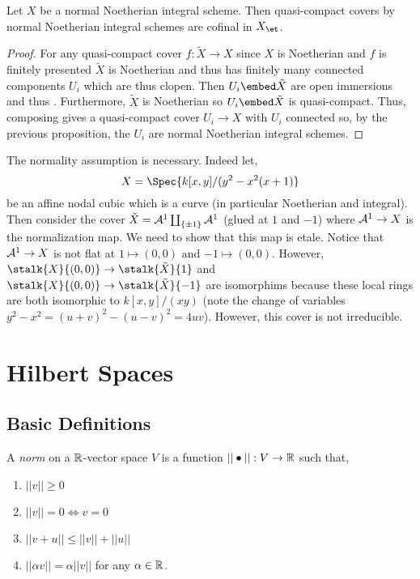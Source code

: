 \documentclass[12pt]{article}
\begin{document}
\begin{cor}
Let $X$ be a normal Noetherian integral scheme. Then quasi-compact \etale covers by normal Noetherian integral schemes are cofinal in $X_{\et}$.
\end{cor}

\begin{proof}
For any quasi-compact \etale cover $f : \tilde{X} \to X$ since $X$ is Noetherian and $f$ is finitely presented $\tilde{X}$ is Noetherian and thus has finitely many connected components $U_i$ which are thus clopen. Then $U_i \embed \tilde{X}$ are open immersions and thus \etale. Furthermore, $\tilde{X}$ is Noetherian so $U_i \embed \tilde{X}$ is quasi-compact. Thus, composing gives a quasi-compact \etale cover  $U_i \to X$ with $U_i$ connected so, by the previous proposition, the $U_i$ are normal Noetherian integral schemes.
\end{proof}

\begin{example}
The normality assumption is necessary. Indeed let,
\[ X = \Spec{k[x,y]/(y^2 - x^2 (x + 1)} \]
be an affine nodal cubic which is a curve (in particular Noetherian and integral). Then consider the cover $\tilde{X} = \mathcal{A}^1 \coprod_{\{ \pm 1 \}} \mathcal{A}^1$ (glued at $1$ and $-1$) where $\mathcal{A}^1 \to X$ is the normalization map. We need to show that this map is etale. Notice that $\mathcal{A}^1 \to X$ is not flat at $1 \mapsto (0,0)$ and $-1 \mapsto (0,0)$. However, $\stalk{X}{(0,0)} \to \stalk{\tilde{X}}{1}$ and $\stalk{X}{(0,0)} \to \stalk{\tilde{X}}{-1}$ are isomorphims because these local rings are both isomorphic to $k[x,y]/(xy)$ (note the change of variables $y^2 - x^2 = (u + v)^2 - (u - v)^2 = 4 uv$). However, this cover is not irreducible.
\end{example}


\section{Hilbert Spaces}

\subsection{Basic Definitions}

\newcommand{\inner}[2]{\left< #1 , #2 \right>}
\renewcommand{\C}{\mathbb{C}}
\renewcommand{\H}{\mathcal{H}}

\begin{defn}
A \textit{norm} on a $\mathbb{R}$-vector space $V$ is a function $|| \bullet || : V \to \mathbb{R}$ such that,
\begin{enumerate}
\item $||v|| \ge 0$
\item $||v|| = 0 \iff v = 0$
\item $||v + u|| \le ||v|| + ||u||$
\item $|| \alpha v || = \alpha || v ||$ for any $\alpha \in \mathbb{R}$.
\end{enumerate}
\end{defn}
\end{document}
